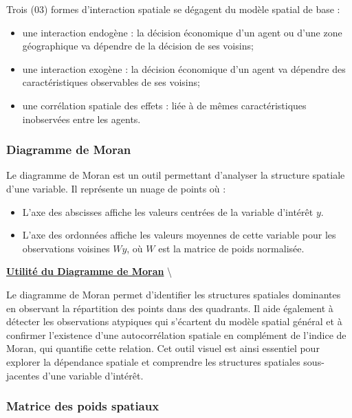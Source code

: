 \documentclass[
]{article}
\providecommand{\tightlist}{%
  \setlength{\itemsep}{0pt}\setlength{\parskip}{0pt}}
\begin{document}
Trois (03) formes d'interaction spatiale se dégagent du modèle spatial
de base :

\begin{itemize}
  \item une interaction endogène : la décision économique d’un agent ou d’une zone géographique va dépendre de la décision de ses voisins;
  \item une interaction exogène : la décision économique d’un agent va dépendre des caractéristiques observables de ses voisins;
  \item une corrélation spatiale des effets : liée à de mêmes caractéristiques inobservées entre les agents.
\end{itemize}

\subsubsection{Diagramme de Moran}\label{diagramme-de-moran}

Le diagramme de Moran est un outil permettant d'analyser la structure
spatiale d'une variable. Il représente un nuage de points où :

\begin{itemize}
\tightlist
\item
  L'axe des abscisses affiche les valeurs centrées de la variable
  d'intérêt \(y\).\\
\item
  L'axe des ordonnées affiche les valeurs moyennes de cette variable
  pour les observations voisines \(W y\), où \(W\) est la matrice de
  poids normalisée.
\end{itemize}

\underline{\textbf{Utilité du Diagramme de Moran}} \textbackslash{}

Le diagramme de Moran permet d'identifier les structures spatiales
dominantes en observant la répartition des points dans des quadrants. Il
aide également à détecter les observations atypiques qui s'écartent du
modèle spatial général et à confirmer l'existence d'une autocorrélation
spatiale en complément de l'indice de Moran, qui quantifie cette
relation. Cet outil visuel est ainsi essentiel pour explorer la
dépendance spatiale et comprendre les structures spatiales sous-jacentes
d'une variable d'intérêt.

\subsubsection{Matrice des poids
spatiaux}\label{matrice-des-poids-spatiaux}
\end{document}
